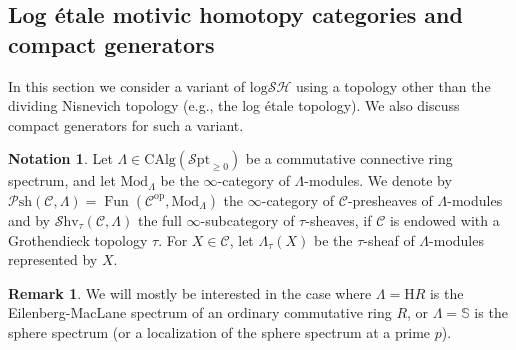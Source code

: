 \documentclass[11pt, a4paper]{amsart}
\theoremstyle{definition}
\newtheorem{rmk}[thm]{Remark}
\newtheorem{notat}[thm]{Notation}
\numberwithin{equation}{subsection}
\newcommand{\Mod}{\mathrm{Mod}}
\newcommand{\infPsh}{\mathcal{P}\mathrm{sh}}
\newcommand{\infShv}{\mathcal{S}\mathrm{hv}}
\newcommand{\infSpt}{\mathcal{S}\mathrm{pt}}
\newcommand{\Fun}{\operatorname{Fun}}
\newcommand{\CAlg}{\mathrm{CAlg}}
\newcommand{\infC}{\mathcal{C}}
\newcommand{\inflogSH}{\mathrm{log}\mathcal{SH}}
\begin{document}
\subsection{Log \'etale motivic homotopy categories and compact generators}\label{sec:cmpt_objects}
In this section we consider a variant of $\inflogSH$ using a topology other than the dividing Nisnevich topology  (e.g., the log \'etale topology).
We also discuss compact generators for such a variant.

\begin{notat}
\label{not:Lambda}
Let $\Lambda\in \CAlg(\infSpt_{\geq 0})$ be a commutative connective ring spectrum, and let $\Mod_\Lambda$ be the $\infty$-category of $\Lambda$-modules. We denote by $\infPsh(\infC, \Lambda)=\Fun(\infC^\mathrm{op},  \Mod_{\Lambda})$ the $\infty$-category of $\infC$-presheaves of $\Lambda$-modules and by $\infShv_\tau( \infC, \Lambda)$ the full $\infty$-subcategory of $\tau$-sheaves, if $\infC$ is endowed with a Grothendieck topology $\tau$.
For $X\in \infC$, let $\Lambda_\tau(X)$ be the $\tau$-sheaf of $\Lambda$-modules represented by $X$.
\end{notat}


\begin{rmk}
    We will mostly be interested in the case where $\Lambda = \mathrm{H} R$ is the Eilenberg-MacLane spectrum of an ordinary commutative ring $R$, or $\Lambda = \mathbb{S}$ is the sphere spectrum (or a localization of the sphere spectrum at a prime $p$). 
\end{rmk}
\end{document}
